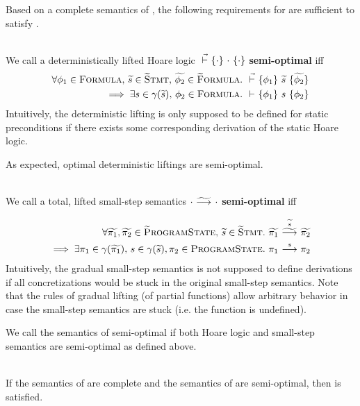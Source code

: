 Based on a complete semantics of \svl, the following requirements for \gvl are sufficient to satisfy .
\begin{definition}~\\
    \label{def:perf-stat}
    We call a deterministically lifted Hoare logic $\dgthoare{}{\cdot}{\cdot}{\cdot}$ \textbf{semi-optimal} iff
    \begin{align*}
    \forall \phi_1 \in \setFormula,\, \grad{s} \in \setGStmt,\, \grad{\phi_2} \in \setGFormula.&~ \dgthoare{}{\phi_1}{\grad{s}}{\grad{\phi_2}}\\ \implies \exists s \in \gamma(\grad{s}),\, \phi_2 \in \setFormula.&~ \thoare{}{\phi_1}{s}{\phi_2}
    \end{align*}
    Intuitively, the deterministic lifting is only supposed to be defined for static preconditions if there exists some corresponding derivation of the static Hoare logic.
    
    As expected, optimal deterministic liftings are semi-optimal.
\end{definition}
\begin{definition}~\\
    \label{def:perf-dyn}
    We call a total, lifted small-step semantics $\gsstep{\cdot}{\cdot}$ \textbf{semi-optimal} iff
    \begin{comment}
    \forall \grad{\pi} \in \setGProgramState.~ (\forall \pi \in \gamma(\grad{\pi}).~ \sstepStuck{\pi}) \implies \gsstep{\grad{\pi}}{\pi_{EX}}
    \end{comment}
    \begin{align*}
    \forall \grad{\pi_1}, \grad{\pi_2} \in \setGProgramState,\, \grad{s} \in \setGStmt.&~ \gsstepConsume{\grad{s}}{\grad{\pi_1}}{\grad{\pi_2}}\\ \implies \exists \pi_1 \in \gamma(\grad{\pi_1}),\, s \in \gamma(\grad{s}), \pi_2 \in \setProgramState.&~ \sstepConsume{s}{\pi_1}{\pi_2}
    \end{align*}
    Intuitively, the gradual small-step semantics is not supposed to define derivations if all concretizations would be stuck in the original small-step semantics.
    Note that the rules of gradual lifting (of partial functions) allow arbitrary behavior in case the small-step semantics are stuck (i.e. the function is undefined).
\end{definition}

We call the semantics of \gvl semi-optimal if both Hoare logic and small-step semantics are semi-optimal as defined above.

\begin{theorem}~\\
    \label{thm:compl-and-so-to-gdpres}
    If the semantics of \svl are complete and the semantics of \gvl are semi-optimal, then  is satisfied.
\end{theorem}
